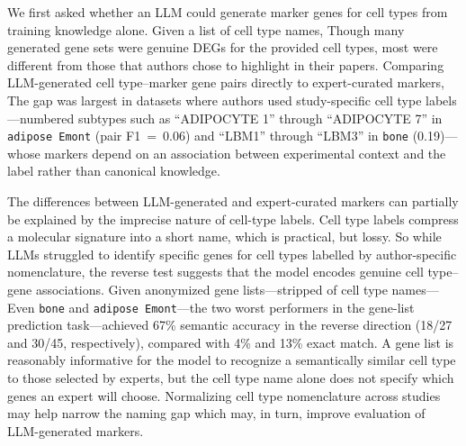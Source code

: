 \documentclass[10pt,twocolumn]{article}
\theoremstyle{plain}
\theoremstyle{definition}
\theoremstyle{remark}
\begin{document}
We first asked whether an LLM could generate marker genes for cell types from training knowledge alone. Given a list of cell type names,  Though many generated gene sets were genuine DEGs for the provided cell types, most were different from those that authors chose to highlight in their papers. Comparing LLM-generated cell type--marker gene pairs directly to expert-curated markers,  The gap was largest in datasets where authors used study-specific cell type labels---numbered subtypes such as ``ADIPOCYTE 1'' through ``ADIPOCYTE 7'' in \texttt{adipose Emont} (pair F1~=~0.06) and ``LBM1'' through ``LBM3'' in \texttt{bone} (0.19)---whose markers depend on an association between experimental context and the label rather than canonical knowledge.

The differences between LLM-generated and expert-curated markers can partially be explained by the imprecise nature of cell-type labels. Cell type labels compress a molecular signature into a short name, which is practical, but lossy. So while LLMs struggled to identify specific genes for cell types labelled by author-specific nomenclature, the reverse test suggests that the model encodes genuine cell type--gene associations. Given anonymized gene lists---stripped of cell type names--- Even \texttt{bone} and \texttt{adipose Emont}---the two worst performers in the gene-list prediction task---achieved 67\% semantic accuracy in the reverse direction (18/27 and 30/45, respectively), compared with 4\% and 13\% exact match. A gene list is reasonably informative for the model to recognize a semantically similar cell type to those selected by experts, but the cell type name alone does not specify which genes an expert will choose. Normalizing cell type nomenclature across studies may help narrow the naming gap which may, in turn, improve evaluation of LLM-generated markers.
\end{document}
